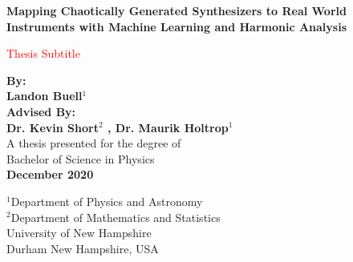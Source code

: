 \documentclass[12pt,letterpaper]{article}
\begin{document}

\begin{titlepage}
	\begin{center}
   		\vspace*{1cm}
       	\begin{LARGE}
       	\textbf{Mapping Chaotically Generated Synthesizers to Real World Instruments with Machine Learning and Harmonic Analysis} \\
       	\end{LARGE}
       	\vspace{1cm}
       	\begin{Large}
       	\textcolor{red}{Thesis Subtitle}
       	\end{Large}             
       	\vspace{1.5cm}

       	\textbf{By: \\ Landon Buell$^1$} \\       
       	\vspace{0.5cm}
       	\textbf{Advised By: \\ Dr. Kevin Short$^2$ , Dr. Maurik Holtrop$^1$} \\
      	\vspace{1cm}
      	A thesis presented for the degree of\\
       	Bachelor of Science in Physics \\
       	\vspace{0.5cm}
       	\textbf{December 2020}
        \vspace{1cm}

       	\vfill
      
       	\vspace{1cm}              
       	$^1$Department of Physics and Astronomy\\           
       	$^2$Department of Mathematics and Statistics\\
       	\vspace{0.5cm}  
       	University of New Hampshire\\
       	Durham New Hampshire, USA\\            
   \end{center}
\end{titlepage}

\tableofcontents

\end{document}
